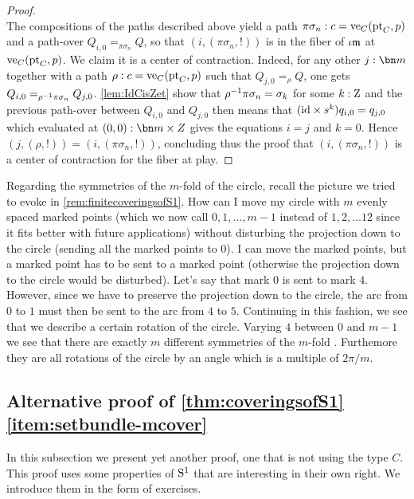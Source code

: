 \begin{proof}
\begin{displaymath}
  \end{displaymath}
  The compositions of the paths described above yield a path
  $\pi\sigma_n: c = \ve_C(\pt_C,p)$ and a path-over
  $Q_{i,0} =_{\pi\sigma_n} Q$, so that $(i,(\pi\sigma_n,!))$ is in the
  fiber of $\iota\mathfrak m$ at $\ve_C(\pt_C,p)$. We claim it is a center of
  contraction. Indeed, for any other $j:\bn m$ together with a path
  $\rho:c=\ve_C(\pt_C,p)$ such that $Q_{j,0}=_\rho Q$, one gets
  $Q_{i,0}=_{\rho^{-1} \pi\sigma_n}Q_{j,0}$. \cref{lem:IdCisZet} show
  that $\rho^{-1}\pi\sigma_n = \sigma_k$ for some $k:\mathrm{Z}$ and the
  previous path-over between $Q_{i,0}$ and $Q_{j,0}$ then means that
  $(\mathord{\mathrm{id}} \times s^k)q_{i,0}=q_{j,0}$ which evaluated at
  $(0,0):\bn m\times Z$ gives the equations $i=j$ and $k=0$. Hence
  $(j,(\rho,!)) = (i,(\pi\sigma_n,!))$, concluding thus the proof that
  $(i,(\pi\sigma_n,!))$ is a center of contraction for the fiber at
  play.

  \end{proof}

  \begin{remark}
    Regarding the symmetries of the $m$-fold \covering of the circle, recall the picture we tried to evoke in \cref{rem:finitecoveringsofS1}.  How can I move my circle with $m$ evenly spaced marked points  (which we now call $0,1,\dots, m-1$ instead of $1,2,\dots 12$ since it fits better with future applications) without disturbing the projection down to the circle (sending all the marked points to $0$).  I can move the marked points, but a marked point has to be sent to a marked point (otherwise the projection down to the circle would be disturbed).  Let's say that mark $0$ is sent to mark $4$.  However, since we have to preserve the projection down to the circle, the arc from $0$ to $1$ must then be sent to the arc from $4$ to $5$.  Continuing in this fashion, we see that we describe a certain rotation of the circle.  Varying $4$ between $0$ and $m-1$ we see that there are exactly $m$ different symmetries of the $m$-fold \covering.  Furthemore they are all rotations of the circle by an angle which is a multiple of $2\pi/m$.
  \end{remark}


\subsection*{Alternative proof of \cref{thm:coveringsofS1}\ref{item:setbundle-mcover}}

In this subsection we present yet another proof, one that is not using the type $C$. 
This proof uses some properties of ${\mathrm{S}^1}$ that are interesting in their own right.
We introduce them in the form of exercises.

